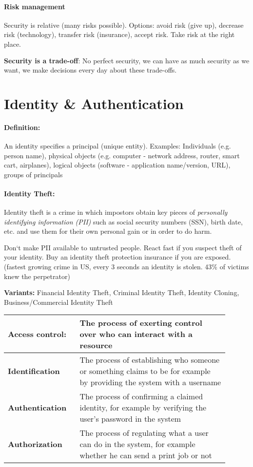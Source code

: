 \paragraph{Risk management}
Security is relative (many risks possible). Options: avoid risk (give up), decrease risk
(technology), transfer risk (insurance),
accept risk. Take risk at the right place.

\textbf{Security is a trade-off}: No perfect security, we can have as much security as we want, we make decisions
every day about these trade-offs.

\section{Identity \& Authentication}
\paragraph{Definition:} An identity specifies a principal (unique entity). Examples: Individuals (e.g. person name), physical objects (e.g.
computer - network address, router, smart cart, airplanes), logical
objects (software - application name/version, URL), groups of
principals

\paragraph{Identity Theft:} Identity theft is a crime in which impostors obtain key
pieces of \emph{personally identifying information (PII)} such as social
security numbers (SSN), birth date, etc. and use them for their own
personal gain or in order to do harm.

 Don‘t make PII available to untrusted
people. React fast if you suspect theft of your identity. Buy an identity
theft protection insurance if you are exposed. (fastest growing crime
in US, every 3 seconds an identity is stolen. 43\% of victims knew the
perpetrator)

\textbf{Variants:} Financial Identity Theft, Criminal Identity Theft, Identity
Cloning, Business/Commercial Identity Theft

\begin{tabular}{p{0.28\linewidth}p{0.62\linewidth}}
\textbf{Access control:} & The process of exerting control over who can interact with a resource \\
\hline
\hline
\textbf{Identification} & The process of establishing who someone or something claims to be for example by providing the system with a username \\
\hline
\textbf{Authentication} & The process of confirming a claimed identity, for example by verifying the user's password in the system \\
\hline
\textbf{Authorization} & The process of regulating what a user can do in the system, for example whether he can send a print job or not \\
\end{tabular}

